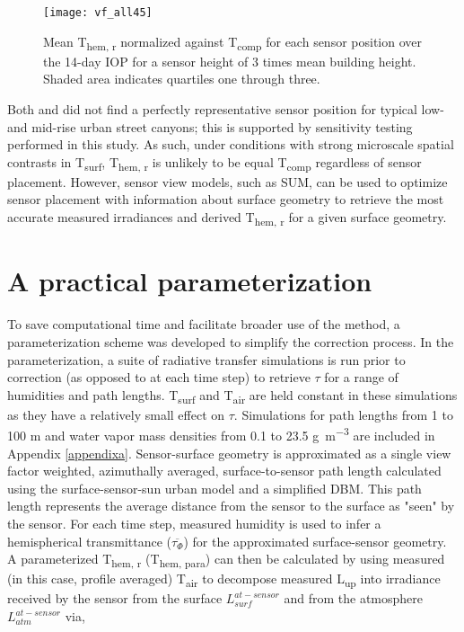 \begin{bibunit}
  \begin{figure}[H]
	\centering
	\texttt{[image: vf\_all45]}
	\caption{Mean T\textsubscript{hem, r} normalized against T\textsubscript{comp} for each sensor position over the 14-day IOP for a sensor height of 3 times mean building height. Shaded area indicates quartiles one through three.}
	\label{vf_all45}
\end{figure}
 
Both \citet{Roberts2010} and \citet{Adderley2015} did not find a perfectly representative sensor position for typical low- and mid-rise urban street canyons; this is supported by sensitivity testing performed in this study. As such, under conditions with strong microscale spatial contrasts in T\textsubscript{surf}, T\textsubscript{hem, r} is unlikely to be equal T\textsubscript{comp} regardless of sensor placement. However, sensor view models, such as SUM, can be used to optimize sensor placement with information about surface geometry to retrieve the most accurate measured irradiances and derived T\textsubscript{hem, r} for a given surface geometry.

\section{A practical parameterization}

To save computational time and facilitate broader use of the method, a parameterization scheme was developed to simplify the correction process. In the parameterization, a suite of radiative transfer simulations is run prior to correction (as opposed to at each time step) to retrieve $\tau$ for a range of humidities and path lengths. T\textsubscript{surf} and T\textsubscript{air} are held constant in these simulations as they have a relatively small effect on $\tau$. Simulations for path lengths from 1 to 100 \si{\meter} and water vapor mass densities from 0.1 to 23.5 \si{\gram\per\meter\cubed} are included in Appendix \ref{appendixa}. Sensor-surface geometry is approximated as a single view factor weighted, azimuthally averaged, surface-to-sensor path length calculated using the surface-sensor-sun urban model \citep{Soux2004} and a simplified DBM. This path length represents the average distance from the sensor to the surface as "seen" by the sensor. For each time step, measured humidity is used to infer a hemispherical transmittance ($\overline{\tau_{\Phi}}$) for the approximated surface-sensor geometry. A parameterized T\textsubscript{hem, r} (T\textsubscript{hem, para}) can then be calculated by using measured (in this case, profile averaged) T\textsubscript{air} to decompose measured L\textsubscript{up} into irradiance received by the sensor from the surface $L_{surf}^{at-sensor}$ and from the atmosphere $L_{atm}^{at-sensor}$ via, 


\end{bibunit}
